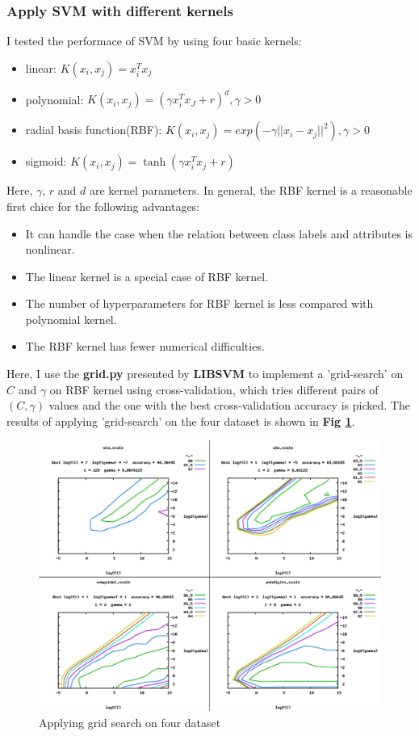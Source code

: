 \documentclass{article}
\theoremstyle{definition}
\numberwithin{equation}{section}
\numberwithin{figure}{section}
\begin{document}
 \subsubsection{Apply SVM with different kernels}
I tested the performace of SVM by using four basic kernels:
\begin{itemize}
\item linear: $K(x_i,x_j)=x_i^Tx_j$
\item polynomial: $K(x_i,x_j)=(\gamma x_i^Tx_J+r)^d, \gamma>0$
\item radial basis function(RBF): $K(x_i,x_j)=exp(-\gamma||x_i-x_j||^2),\gamma>0$
\item sigmoid: $K(x_i,x_j)=\tanh(\gamma x_i^Tx_j+r)$
\end{itemize}
Here, $\gamma$, $r$ and $d$ are kernel parameters. In general, the RBF kernel is a reasonable first chice for the following advantages:
\begin{itemize}
\item It can handle the
case when the relation between class labels and attributes is nonlinear.
\item The linear kernel is a special case of RBF kernel.
\item The number of hyperparameters for RBF kernel is less compared with  polynomial kernel.
\item  The RBF kernel has fewer numerical difficulties.
\end{itemize}
Here, I use the \textbf{grid.py} presented by \textbf{LIBSVM} to implement a 'grid-search' on $C$ and $\gamma$ on RBF kernel using cross-validation, which tries different pairs of $(C,\gamma)$ values and the one with the best cross-validation accuracy is picked. The results of applying 'grid-search' on the four dataset is shown in \textbf{Fig \ref{grid}}.
 
\begin{figure}[htbp]
  	\centering
  	\includegraphics[width=12cm]{fig/grid.jpg}
  \caption{Applying grid search on four dataset}
  \label{grid}
  \end{figure}
\end{document}
